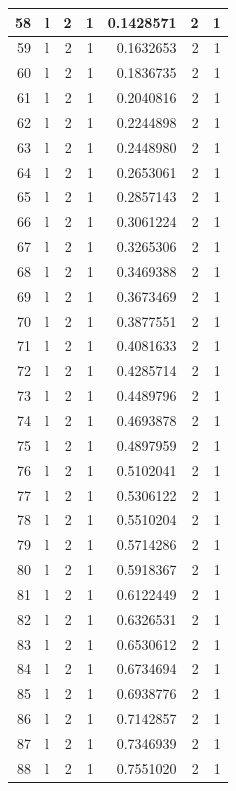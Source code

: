 \documentclass[
  letterpaper,
  DIV=11,
  numbers=noendperiod]{scrreprt}
\begin{document}
\begin{table}
\begin{tabular}[t]{r|l|r|r|r|r|r}
\hline
58 & l & 2 & 1 & 0.1428571 & 2 & 1\\
\hline
59 & l & 2 & 1 & 0.1632653 & 2 & 1\\
\hline
60 & l & 2 & 1 & 0.1836735 & 2 & 1\\
\hline
61 & l & 2 & 1 & 0.2040816 & 2 & 1\\
\hline
62 & l & 2 & 1 & 0.2244898 & 2 & 1\\
\hline
63 & l & 2 & 1 & 0.2448980 & 2 & 1\\
\hline
64 & l & 2 & 1 & 0.2653061 & 2 & 1\\
\hline
65 & l & 2 & 1 & 0.2857143 & 2 & 1\\
\hline
66 & l & 2 & 1 & 0.3061224 & 2 & 1\\
\hline
67 & l & 2 & 1 & 0.3265306 & 2 & 1\\
\hline
68 & l & 2 & 1 & 0.3469388 & 2 & 1\\
\hline
69 & l & 2 & 1 & 0.3673469 & 2 & 1\\
\hline
70 & l & 2 & 1 & 0.3877551 & 2 & 1\\
\hline
71 & l & 2 & 1 & 0.4081633 & 2 & 1\\
\hline
72 & l & 2 & 1 & 0.4285714 & 2 & 1\\
\hline
73 & l & 2 & 1 & 0.4489796 & 2 & 1\\
\hline
74 & l & 2 & 1 & 0.4693878 & 2 & 1\\
\hline
75 & l & 2 & 1 & 0.4897959 & 2 & 1\\
\hline
76 & l & 2 & 1 & 0.5102041 & 2 & 1\\
\hline
77 & l & 2 & 1 & 0.5306122 & 2 & 1\\
\hline
78 & l & 2 & 1 & 0.5510204 & 2 & 1\\
\hline
79 & l & 2 & 1 & 0.5714286 & 2 & 1\\
\hline
80 & l & 2 & 1 & 0.5918367 & 2 & 1\\
\hline
81 & l & 2 & 1 & 0.6122449 & 2 & 1\\
\hline
82 & l & 2 & 1 & 0.6326531 & 2 & 1\\
\hline
83 & l & 2 & 1 & 0.6530612 & 2 & 1\\
\hline
84 & l & 2 & 1 & 0.6734694 & 2 & 1\\
\hline
85 & l & 2 & 1 & 0.6938776 & 2 & 1\\
\hline
86 & l & 2 & 1 & 0.7142857 & 2 & 1\\
\hline
87 & l & 2 & 1 & 0.7346939 & 2 & 1\\
\hline
88 & l & 2 & 1 & 0.7551020 & 2 & 1\\

\end{tabular}
\end{table}
\end{document}
